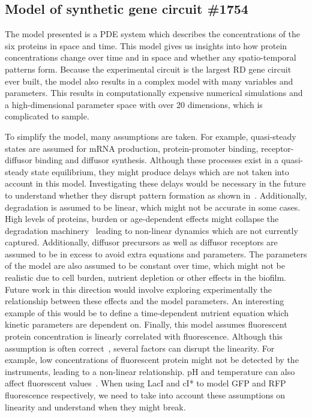 \subsection{Model of synthetic gene circuit \#1754}
The model presented is a PDE system which describes the concentrations of the six proteins in space and time.
This model gives us insights into how protein concentrations change over time and in space and whether any spatio-temporal patterns form.
Because the experimental circuit is the largest RD gene circuit ever built, the model also results in a complex model with many variables and parameters.
This results in computationally expensive numerical simulations and a high-dimensional parameter space with over 20 dimensions, which is complicated to sample.

To simplify the model, many assumptions are taken.
For example, quasi-steady states are assumed for mRNA production, protein-promoter binding, receptor-diffusor binding and diffusor synthesis.
Although these processes exist in a quasi-steady state equilibrium, they might produce delays which are not taken into account in this model.
Investigating these delays would be necessary in the future to understand whether they disrupt pattern formation as shown in~\cite{Maini2012}.
Additionally, degradation is assumed to be linear, which might not be accurate in some cases.
High levels of proteins, burden or age-dependent effects might collapse the degradation machinery~\parencite{kintaka2020genetic} leading to non-linear dynamics which are not currently captured.
Additionally, diffusor precursors as well as diffusor receptors are assumed to be in excess to avoid extra equations and parameters.
The parameters of the model are also assumed to be constant over time, which might not be realistic due to cell burden, nutrient depletion or other effects in the biofilm.
Future work in this direction would involve exploring experimentally the relationship between these effects and the model parameters.
An interesting example of this would be to define a time-dependent nutrient equation which kinetic parameters are dependent on.
Finally, this model assumes fluorescent protein concentration is linearly correlated with fluorescence.
Although this assumption is often correct~\parencite{soboleski2005green, csibra2022absolute}, several factors can disrupt the linearity.
For example, low concentrations of fluorescent protein might not be detected by the instruments, leading to a non-linear relationship.
pH and temperature can also affect fluorescent values~\parencite{ward1982spectral}.
When using LacI and cI* to model GFP and RFP fluorescence respectively, we need to take into account these assumptions on linearity and understand when they might break.

